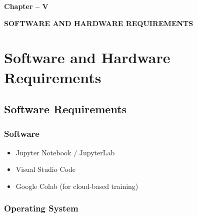 \documentclass[12pt,a4paper]{article}
\begin{document}

\clearpage

\begin{center}
    \vspace*{10cm}
    
    {\fontsize{16}{19.2}\selectfont\bfseries
    Chapter -- V}
    
    \vspace{1cm}
    
    {\fontsize{16}{19.2}\selectfont\bfseries
    SOFTWARE AND HARDWARE REQUIREMENTS}
    
    \vspace*{\fill}
\end{center}

\thispagestyle{plain}


\clearpage

\section{Software and Hardware Requirements}

\subsection{Software Requirements}

\subsubsection{Software}

\begin{itemize}
    \item Jupyter Notebook / JupyterLab
    \item Visual Studio Code
    \item Google Colab (for cloud-based training)
\end{itemize}

\subsubsection{Operating System}
\end{document}
